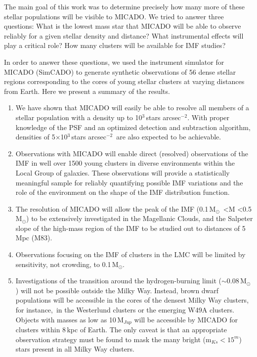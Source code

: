 \documentclass{aa}
\newcommand{\msun}{M$_\odot$~}
\newcommand{\msune}{M$_\odot$}
\newcommand{\s}{$\sim$}
\newcommand{\h}[1]{$^{#1}$}
\newcommand{\spa}{stars arcsec$^{-2}$~}
\newcommand{\spae}{stars arcsec$^{-2}$}
\begin{document}

The main goal of this work was to determine precisely how many more of these stellar populations will be visible to MICADO. We tried to answer three questions:
What is the lowest mass star that MICADO will be able to observe reliably for a given stellar density and distance?
What instrumental effects will play a critical role?
How many clusters will be available for IMF studies?


In order to answer these questions, we used the instrument simulator for MICADO (SimCADO) to generate synthetic observations of 56 dense stellar regions corresponding to the cores of young stellar clusters at varying distances from Earth.
Here we present a summary of the results.

\begin{enumerate}
    \item We have shown that MICADO will easily be able to resolve all members of a stellar population with a density up to 10\h3\,\spae.
    With proper knowledge of the PSF and an optimized detection and subtraction algorithm, densities of 5$\times$10\h3\,\spa are also expected to be achievable.

    \item Observations with MICADO will enable direct (resolved) observations of the IMF in well over 1500 young clusters in diverse environments within the Local Group of galaxies.
    These observations will provide a statistically meaningful sample for reliably quantifying possible IMF variations and the role of the environment on the shape of the IMF distribution function.

    \item The resolution of MICADO will allow the peak of the IMF (0.1\,\msun\textless M \textless0.5\,\msune) to be extensively investigated in the Magellanic Clouds, and the Salpeter slope of the high-mass region of the IMF to be studied out to distances of 5\,Mpc (M83).

    \item Observations focusing on the IMF of clusters in the LMC will be limited by sensitivity, not crowding, to 0.1\,\msune.

    \item Investigations of the transition around the hydrogen-burning limit (\s0.08\,\msune) will not be possible outside the Milky Way.
    Instead, brown dwarf populations will be accessible in the cores of the densest Milky Way clusters, for instance,\ in the Westerlund clusters or the emerging W49A clusters.
    Objects with masses as low as 10\,M$_{Jup}$ will be accessible by MICADO for clusters within 8\,kpc of Earth.
    The only caveat is that an appropriate observation strategy must be found to mask the many bright (m$_{Ks}<15^m$) stars present in all Milky Way clusters.


\end{enumerate}
\end{document}
